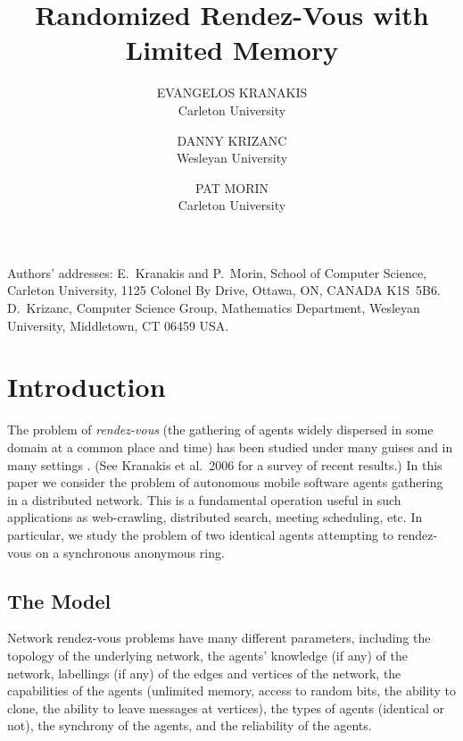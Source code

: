 \documentclass[acmtoalg]{acmtrans2m}
\title{Randomized Rendez-Vous with Limited Memory}
\author{\MakeUppercase{Evangelos Kranakis} \\
           Carleton University \and
	\MakeUppercase{Danny Krizanc} \\ 
           Wesleyan University \and
	\MakeUppercase{Pat Morin} \\
           Carleton University}
\let\orgsetcounter\setcounter  %
\begin{document}
\setcounter{page}{1}

{\let\setcounter\orgsetcounter
\begin{bottomstuff}
Authors' addresses: E.~Kranakis and P.~Morin, School of Computer Science,
Carleton University, 1125 Colonel By Drive, Ottawa, ON, CANADA K1S~5B6.\newline
D.~Krizanc, Computer Science Group, Mathematics Department, Wesleyan
University, Middletown, CT 06459 USA.
\end{bottomstuff}
}
\maketitle


\section{Introduction}

The problem of {\em rendez-vous} (the gathering of agents
widely dispersed in some domain at a common place and
time) has been studied under many guises and in many settings
\cite{alpernGal03,Marco,dmsvw08,dessmark,dobrev,fkkss,fkklss,gakra,kowalski1,kowalski2,kkss,mgkkpv06,markou,RoyDudek,sawchuk04,Yamashita,yu}.  
(See Kranakis et al.\ 2006 for a survey of recent results.) In this
paper we consider the problem of autonomous mobile software agents
gathering in a distributed network. This is a fundamental operation
useful in such applications as web-crawling, distributed search, meeting
scheduling, etc. In particular, we study the problem of two identical
agents attempting to rendez-vous on a synchronous anonymous ring.

\subsection{The Model}

Network rendez-vous problems have many different parameters, including
the topology of the underlying network, the agents' knowledge (if any) of
the network, labellings (if any) of the edges and vertices of the network,
the capabilities of the agents (unlimited memory, access to random bits,
the ability to clone, the ability to leave messages at vertices), the
types of agents (identical or not), the synchrony of the agents, and
the reliability of the agents. 
\end{document}
